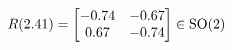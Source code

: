 \documentclass[preview]{standalone}
\begin{document}
\begin{align*}
\special{dvisvgm:raw <g id='unique000'>}R(2.41) = \begin{bmatrix} -0.74 & -0.67 \\ 0.67 & -0.74 \end{bmatrix} \in \text{SO}(2)\special{dvisvgm:raw </g>}
\end{align*}
\end{document}
